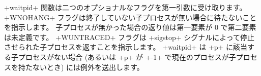 \ml+waitpid+ 関数は二つのオプショナルなフラグを第一引数に受け取ります。
\ml+WNOHANG+ フラグは終了していない子プロセスが無い場合に待たないことを指示します。
子プロセスが無かった場合の返り値は第一要素が 0 で第二要素は未定義です。
\ml+WUNTRACED+ フラグは \ml+sigstop+ シグナルによって停止させられた子プロセスを返すことを指示します。
\ml+waitpid+ は \ml+p+ に該当する子プロセスがない場合 (あるいは \ml+p+ が \ml+-1+ で現在のプロセスが子プロセスを持たないとき)
には例外を送出します。
